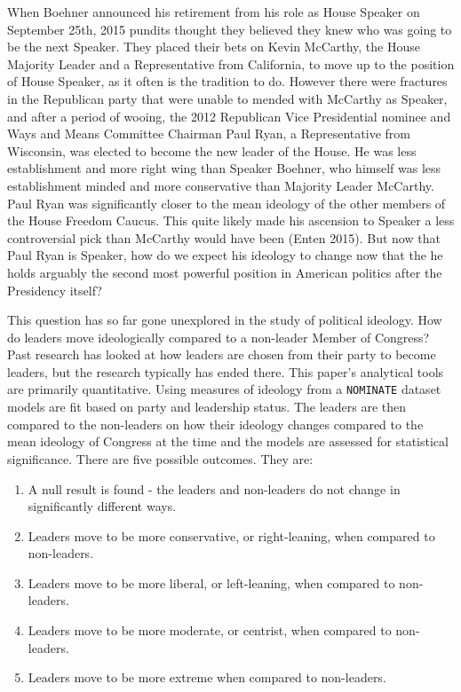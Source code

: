 \documentclass[12pt,twoside]{reedthesis}
\begin{document}
  When Boehner announced his retirement from his role as House Speaker on
  September 25th, 2015 pundits thought they believed they knew who was
  going to be the next Speaker. They placed their bets on Kevin McCarthy,
  the House Majority Leader and a Representative from California, to move
  up to the position of House Speaker, as it often is the tradition to do.
  However there were fractures in the Republican party that were unable to
  mended with McCarthy as Speaker, and after a period of wooing, the 2012
  Republican Vice Presidential nominee and Ways and Means Committee
  Chairman Paul Ryan, a Representative from Wisconsin, was elected to
  become the new leader of the House. He was less establishment and more
  right wing than Speaker Boehner, who himself was less establishment
  minded and more conservative than Majority Leader McCarthy. Paul Ryan
  was significantly closer to the mean ideology of the other members of
  the House Freedom Caucus. This quite likely made his ascension to
  Speaker a less controversial pick than McCarthy would have been (Enten
  2015). But now that Paul Ryan is Speaker, how do we expect his ideology
  to change now that the he holds arguably the second most powerful
  position in American politics after the Presidency itself?
  
  This question has so far gone unexplored in the study of political
  ideology. How do leaders move ideologically compared to a non-leader
  Member of Congress? Past research has looked at how leaders are chosen
  from their party to become leaders, but the research typically has ended
  there. This paper's analytical tools are primarily quantitative. Using
  measures of ideology from a \texttt{NOMINATE} dataset models are fit
  based on party and leadership status. The leaders are then compared to
  the non-leaders on how their ideology changes compared to the mean
  ideology of Congress at the time and the models are assessed for
  statistical significance. There are five possible outcomes. They are:
  
  \begin{enumerate}
  \def\labelenumi{\arabic{enumi}.}
  \itemsep1pt\parskip0pt
  \item
    A null result is found - the leaders and non-leaders do not change in
    significantly different ways.
  \item
    Leaders move to be more conservative, or right-leaning, when compared
    to non-leaders.
  \item
    Leaders move to be more liberal, or left-leaning, when compared to
    non-leaders.
  \item
    Leaders move to be more moderate, or centrist, when compared to
    non-leaders.
  \item
    Leaders move to be more extreme when compared to non-leaders.
  \end{enumerate}
  
\end{document}
